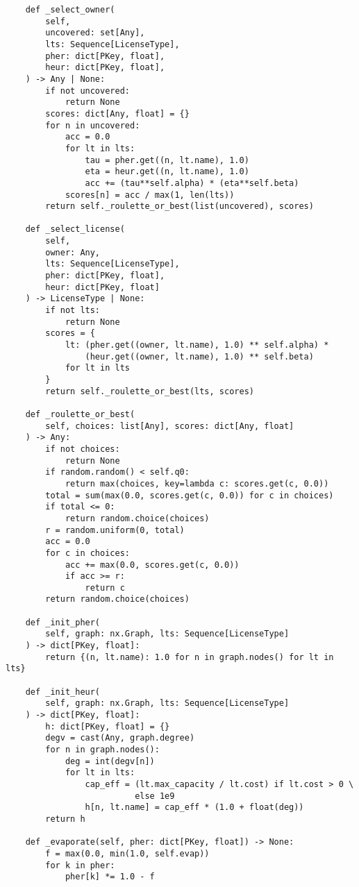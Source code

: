 {\begin{verbatim}
    def _select_owner(
        self,
        uncovered: set[Any],
        lts: Sequence[LicenseType],
        pher: dict[PKey, float],
        heur: dict[PKey, float],
    ) -> Any | None:
        if not uncovered:
            return None
        scores: dict[Any, float] = {}
        for n in uncovered:
            acc = 0.0
            for lt in lts:
                tau = pher.get((n, lt.name), 1.0)
                eta = heur.get((n, lt.name), 1.0)
                acc += (tau**self.alpha) * (eta**self.beta)
            scores[n] = acc / max(1, len(lts))
        return self._roulette_or_best(list(uncovered), scores)

    def _select_license(
        self,
        owner: Any,
        lts: Sequence[LicenseType],
        pher: dict[PKey, float],
        heur: dict[PKey, float]
    ) -> LicenseType | None:
        if not lts:
            return None
        scores = {
            lt: (pher.get((owner, lt.name), 1.0) ** self.alpha) *
                (heur.get((owner, lt.name), 1.0) ** self.beta)
            for lt in lts
        }
        return self._roulette_or_best(lts, scores)

    def _roulette_or_best(
        self, choices: list[Any], scores: dict[Any, float]
    ) -> Any:
        if not choices:
            return None
        if random.random() < self.q0:
            return max(choices, key=lambda c: scores.get(c, 0.0))
        total = sum(max(0.0, scores.get(c, 0.0)) for c in choices)
        if total <= 0:
            return random.choice(choices)
        r = random.uniform(0, total)
        acc = 0.0
        for c in choices:
            acc += max(0.0, scores.get(c, 0.0))
            if acc >= r:
                return c
        return random.choice(choices)

    def _init_pher(
        self, graph: nx.Graph, lts: Sequence[LicenseType]
    ) -> dict[PKey, float]:
        return {(n, lt.name): 1.0 for n in graph.nodes() for lt in lts}

    def _init_heur(
        self, graph: nx.Graph, lts: Sequence[LicenseType]
    ) -> dict[PKey, float]:
        h: dict[PKey, float] = {}
        degv = cast(Any, graph.degree)
        for n in graph.nodes():
            deg = int(degv[n])
            for lt in lts:
                cap_eff = (lt.max_capacity / lt.cost) if lt.cost > 0 \
                          else 1e9
                h[n, lt.name] = cap_eff * (1.0 + float(deg))
        return h

    def _evaporate(self, pher: dict[PKey, float]) -> None:
        f = max(0.0, min(1.0, self.evap))
        for k in pher:
            pher[k] *= 1.0 - f


\end{verbatim}}
